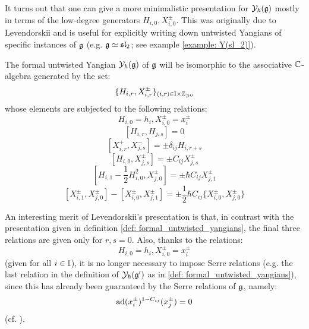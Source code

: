         It turns out that one can give a more minimalistic presentation for $\mathcal{Y}_{\hbar}(\mathfrak{g})$ mostly in terms of the low-degree generators $H_{i, 0}, X_{i, 0}^{\pm}$. This was originally due to Levendorskii and is useful for explicitly writing down untwisted Yangians of specific instances of $\mathfrak{g}$ (e.g. $\mathfrak{g} \simeq \mathfrak{sl}_2$; see example \ref{example: Y(sl_2)}).
        \begin{theorem} \label{theorem: levendorskii_presentation}
            \cite[Theorem 1.2]{levendorskii_finite_type_yangians_presentation} The formal untwisted Yangian $\mathcal{Y}_{\hbar}(\mathfrak{g})$ of $\mathfrak{g}$ will be isomorphic to the associative $\mathbb{C}$-algebra generated by the set:
                $$\{ H_{i, r}, X_{i, r}^{\pm} \}_{(i, r) \in \simpleroots \x \Z_{\geq 0}}$$
            whose elements are subjected to the following relations:
                $$H_{i, 0} = h_i, X_{i, 0}^{\pm} = x_i^{\pm}$$
                $$[ H_{i, r}, H_{j, s} ] = 0$$
                $$[ X_{i, r}^+, X_{j, s}^- ] = \pm \delta_{ij} H_{i, r + s}$$
                $$[ H_{i, 0}, X_{j, s}^{\pm} ] = \pm C_{ij} X_{j, s}^{\pm}$$
                $$\left[ H_{i, 1} - \frac12 H_{i, 0}^2, X_{j, 0}^{\pm} \right] = \pm \hbar C_{ij} X_{j, 1}^{\pm}$$
                $$[ X_{i, 1}^{\pm}, X_{j, 0}^{\pm} ] - [ X_{i, 0}^{\pm}, X_{j, 1}^{\pm} ] = \pm \frac12 \hbar C_{ij} \{X_{i, 0}^{\pm}, X_{j, 0}^{\pm}\}$$
        \end{theorem}
        \begin{remark}
            An interesting merit of Levendorskii's presentation is that, in contrast with the presentation given in definition \ref{def: formal_untwisted_yangians}, the final three relations are given only for $r, s = 0$. Also, thanks to the relations:
                $$H_{i, 0} = h_i, X_{i, 0}^{\pm} = x_i^{\pm}$$
            (given for all $i \in \mathbb{I}$), it is no longer necessary to impose Serre relations (e.g. the last relation in the definition of $\mathcal{Y}_{\hbar}(\mathfrak{g}')$ as in \ref{def: formal_untwisted_yangians}), since this has already been guaranteed by the Serre relations of $\mathfrak{g}$, namely:
                $$\mathrm{ad}(x_i^{\pm})^{1 - C_{ij}}( x_j^{\pm} ) = 0$$
            (cf. \cite{humphreys_lie_algebras}).
        \end{remark}
